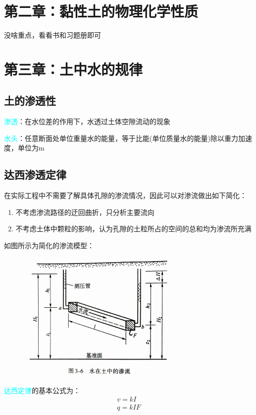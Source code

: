 \documentclass[12pt,a4paper]{ctexart}
\begin{document}
	\newpage 
                
	 
\section{第二章：黏性土的物理化学性质}
	没啥重点，看看书和习题册即可
	
	\section{第三章：土中水的规律}
	\subsection{土的渗透性}  
	\textcolor{cyan}{渗透}：在水位差的作用下，水透过土体空隙流动的现象
	  
	\textcolor{cyan}{水头}：任意断面处单位重量水的能量，等于比能(单位质量水的能量)除以重力加速度，单位为m
	
	\subsection{达西渗透定律}   
	在实际工程中不需要了解具体孔隙的渗流情况，因此可以对渗流做出如下简化：
	\begin{enumerate}
		\item 不考虑渗流路径的迂回曲折，只分析主要流向
		\item 不考虑土体中颗粒的影响，认为孔隙的土粒所占的空间的总和均为渗流所充满  
	\end{enumerate} 

	如图所示为简化的渗流模型：
	\begin{figure}[h]
		\centering
		\includegraphics[width = 8cm ]{sl}
	\end{figure}

	\textcolor{cyan}{达西定律}的基本公式为： 
	\begin{gather}
			v=kI\\
			q=kIF
	\end{gather}
	
\end{document}
